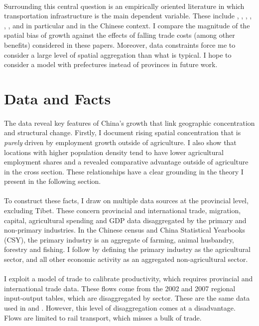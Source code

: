 \documentclass[]{article}
\theoremstyle{plain}
\begin{document}
\paragraph*{}
Surrounding this central question is an empirically oriented literature in which transportation infrastructure is the main dependent variable. These include \citet{baumsnow2007}, \citet{durturner}, \citet{durturnerurb}, \citet{bs2020}, \citet{herzog2021}, \citet{faberb}, \citet{bart2018} and in particular \cite{bsetal2017} and \cite{bsetal2020} in the Chinese context. I compare the magnitude of the spatial bias of growth against the effects of falling trade costs (among other benefits) considered in these papers. Moreover, data constraints force me to consider a large level of spatial aggregation than what is typical. I hope to consider a model with prefectures instead of provinces in future work.   

\section{Data and Facts}\label{section:datafacts}
\paragraph*{}
 The data reveal key features of China's growth that link geographic concentration and structural change. Firstly, I document rising spatial concentration that is \textit{purely} driven by employment growth outside of agriculture. I also show that locations with higher population density tend to have lower agricultural employment shares and a revealed comparative advantage outside of agriculture in the cross section. These relationships have a clear grounding in the theory I present in the following section.
\paragraph*{}
To construct these facts, I draw on multiple data sources at the provincial level, excluding Tibet. These concern provincial and international trade, migration, capital, agricultural spending and GDP data disaggregated by the primary and non-primary industries. In the Chinese census and China Statistical Yearbooks (CSY), the primary industry is an aggregate of farming, animal husbandry, forestry and fishing. I follow \cite{hao2020} by defining the primary industry as the agricultural sector, and all other economic activity as an aggregated non-agricultural sector.
\paragraph*{}
I exploit a model of trade to calibrate productivity, which requires provincial and international trade data. These flows come from the 2002 and 2007 regional input-output tables, which are disaggregated by sector. These are the same data used in \cite{Fan2019} and \cite{tombezhu}. However, this level of disaggregation comes at a disadvantage. Flows are limited to rail transport, which misses a bulk of trade. 
\end{document}
